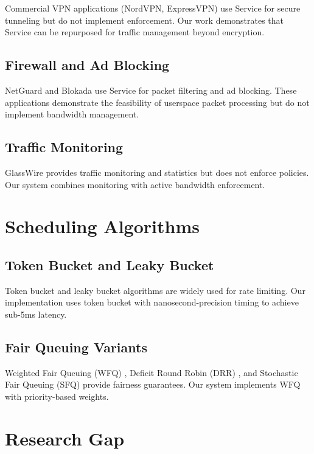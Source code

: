 Commercial VPN applications (NordVPN, ExpressVPN) use \vpn Service for secure tunneling but do not implement \qos enforcement. Our work demonstrates that \vpn Service can be repurposed for traffic management beyond encryption.

\subsection{Firewall and Ad Blocking}

NetGuard \cite{netguard2024} and Blokada \cite{blokada2024} use \vpn Service for packet filtering and ad blocking. These applications demonstrate the feasibility of userspace packet processing but do not implement bandwidth management.

\subsection{Traffic Monitoring}

GlassWire \cite{glasswire2024} provides traffic monitoring and statistics but does not enforce \qos policies. Our system combines monitoring with active bandwidth enforcement.

\section{Scheduling Algorithms}

\subsection{Token Bucket and Leaky Bucket}

Token bucket \cite{rfc2697} and leaky bucket algorithms are widely used for rate limiting. Our implementation uses token bucket with nanosecond-precision timing to achieve sub-5ms latency.

\subsection{Fair Queuing Variants}

Weighted Fair Queuing (WFQ) \cite{demers1989analysis}, Deficit Round Robin (DRR) \cite{shreedhar1996efficient}, and Stochastic Fair Queuing (SFQ) provide fairness guarantees. Our system implements WFQ with priority-based weights.

\section{Research Gap}

